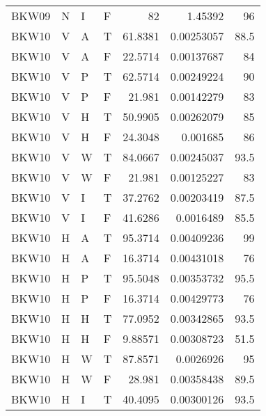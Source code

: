 \begin{longtable}{llllrrr}
    BKW09    & N         & I         & F          & 82         & 1.45392     & 96       \\
    BKW10    & V         & A         & T          & 61.8381    & 0.00253057  & 88.5     \\
    BKW10    & V         & A         & F          & 22.5714    & 0.00137687  & 84       \\
    BKW10    & V         & P         & T          & 62.5714    & 0.00249224  & 90       \\
    BKW10    & V         & P         & F          & 21.981     & 0.00142279  & 83       \\
    BKW10    & V         & H         & T          & 50.9905    & 0.00262079  & 85       \\
    BKW10    & V         & H         & F          & 24.3048    & 0.001685    & 86       \\
    BKW10    & V         & W         & T          & 84.0667    & 0.00245037  & 93.5     \\
    BKW10    & V         & W         & F          & 21.981     & 0.00125227  & 83       \\
    BKW10    & V         & I         & T          & 37.2762    & 0.00203419  & 87.5     \\
    BKW10    & V         & I         & F          & 41.6286    & 0.0016489   & 85.5     \\
    BKW10    & H         & A         & T          & 95.3714    & 0.00409236  & 99       \\
    BKW10    & H         & A         & F          & 16.3714    & 0.00431018  & 76       \\
    BKW10    & H         & P         & T          & 95.5048    & 0.00353732  & 95.5     \\
    BKW10    & H         & P         & F          & 16.3714    & 0.00429773  & 76       \\
    BKW10    & H         & H         & T          & 77.0952    & 0.00342865  & 93.5     \\
    BKW10    & H         & H         & F          & 9.88571    & 0.00308723  & 51.5     \\
    BKW10    & H         & W         & T          & 87.8571    & 0.0026926   & 95       \\
    BKW10    & H         & W         & F          & 28.981     & 0.00358438  & 89.5     \\
    BKW10    & H         & I         & T          & 40.4095    & 0.00300126  & 93.5     \\

\end{longtable}
